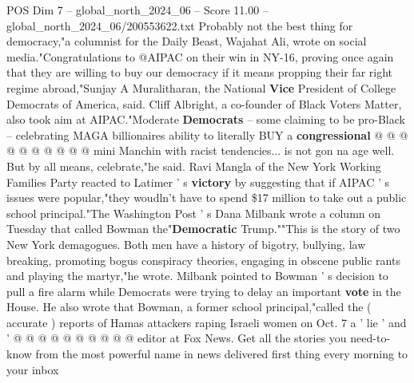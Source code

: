 \begin{textsample}{POS Dim 7 – global\_north\_2024\_06 – Score 11.00 – global\_north\_2024\_06/200553622.txt}
Probably not the best thing for democracy,"a columnist for the Daily Beast, Wajahat Ali, wrote on social media."Congratulations to @AIPAC on their win in NY-16, proving once again that they are willing to buy our democracy if it means propping their far right regime abroad,"Sunjay A Muralitharan, the National \textbf{Vice} President of College Democrats of America, said.
Cliff Albright, a co-founder of Black Voters Matter, also took aim at AIPAC."Moderate \textbf{Democrats} -- some claiming to be pro-Black -- celebrating MAGA billionaires ability to literally BUY a \textbf{congressional} @ @ @ @ @ @ @ @ @ @ mini Manchin with racist tendencies... is not gon na age well.
But by all means, celebrate,"he said.
Ravi Mangla of the New York Working Families Party reacted to Latimer ' s \textbf{victory} by suggesting that if AIPAC ' s issues were popular,"they woudln't have to spend \$17 million to take out a public school principal."The Washington Post ' s Dana Milbank wrote a column on Tuesday that called Bowman the"\textbf{Democratic} Trump.""This is the story of two New York demagogues.
Both men have a history of bigotry, bullying, law breaking, promoting bogus conspiracy theories, engaging in obscene public rants and playing the martyr,"he wrote.
Milbank pointed to Bowman ' s decision to pull a fire alarm while Democrats were trying to delay an important \textbf{vote} in the House.
He also wrote that Bowman, a former school principal,"called the ( accurate ) reports of Hamas attackers raping Israeli women on Oct. 7 a ' lie ' and ' @ @ @ @ @ @ @ @ @ @ editor at Fox News.
Get all the stories you need-to-know from the most powerful name in news delivered first thing every morning to your inbox

\end{textsample}
